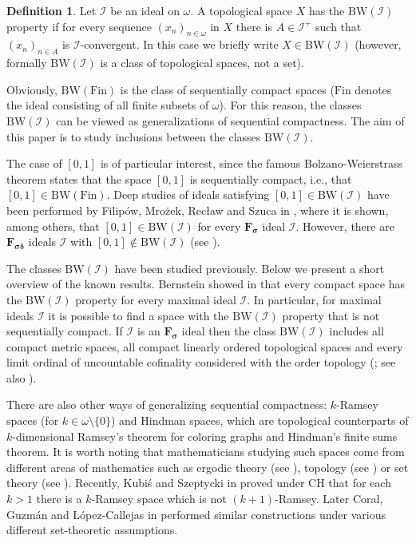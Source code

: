 \documentclass{amsart}
\theoremstyle{plain}
\theoremstyle{definition}
\newtheorem{definition}[theorem]{Definition}
\theoremstyle{remark}
\newcommand{\cI}{\mathcal{I}}
\newcommand{\I}{\cI}
\newcommand{\Fin}{\mathrm{Fin}}
\newcommand{\BW}{\mathrm{BW}}
\begin{document}
\begin{definition}
Let $\I$ be an ideal on $\omega$. A topological space $X$ has the $\BW(\I)$ property if for every sequence  $(x_n)_{n\in \omega}$ in $X$ there is $A\in\I^+$ such that $(x_n)_{n\in A}$ is $\I$-convergent. In this case we briefly write $X\in\BW(\I)$ (however, formally $\BW(\I)$ is a class of topological spaces, not a set). 
\end{definition}

Obviously, $\BW(\Fin)$ is the class of sequentially compact spaces ($\Fin$ denotes the ideal consisting of all finite subsets of $\omega$). For this reason, the classes $\BW(\I)$ can be viewed as generalizations of sequential compactness. The aim of this paper is to study inclusions between the classes $\BW(\I)$. 

The case of $[0,1]$ is of particular interest, since the famous Bolzano-Weierstrass theorem states that the space $[0,1]$ is sequentially compact, i.e., that $[0,1]\in\BW(\Fin)$. Deep studies of ideals satisfying $[0,1]\in\BW(\I)$ have been performed by Filip\'{o}w, Mro\.{z}ek, Rec\l{}aw and Szuca in \cite{MR2320288}, where it is shown, among others, that $[0,1]\in\BW(\I)$ for every $\mathbf{F_\sigma}$ ideal $\I$. However, there are $\mathbf{F_{\sigma\delta}}$ ideals $\I$ with $[0,1]\notin\BW(\I)$ (see \cite{MR1181163}).

The classes $\BW(\I)$ have been studied previously. Below we present a short overview of the known results. Bernstein showed in \cite[Theorem 3.3]{MR251697} that every compact space has the $\BW(\I)$ property for every maximal ideal $\I$. In particular, for maximal ideals $\I$ it is possible to find a space with the $\BW(\I)$ property that is not sequentially compact. If $\I$ is an $\mathbf{F_\sigma}$ ideal then the class $\BW(\I)$ includes all compact metric spaces, all compact linearly ordered topological spaces and every limit ordinal of uncountable cofinality considered with the order topology (\cite[Corollary 5.7]{MR2961261}; see also \cite[theorem 1.1]{FT}).

There are also other ways of generalizing sequential compactness: $k$-Ramsey spaces (for $k\in\omega\setminus\{0\}$) and Hindman spaces, which are topological counterparts of $k$-dimensional Ramsey's theorem for coloring graphs and Hindman's finite sums theorem. It is worth noting that mathematicians studying such spaces come from different areas of mathematics such as ergodic theory (see \cite{MR2757532,BergelsonZelada,MR603625,MR531271}), topology (see \cite{MR3461173,MR3461181,MR2904054}) or set theory (see \cite{KojmanShelah}). Recently, Kubi\'{s} and Szeptycki in \cite{MR4552506} proved under CH that for each $k>1$ there is a $k$-Ramsey space which is not $(k+1)$-Ramsey. Later Coral, Guzm\'{a}n and L\'{o}pez-Callejas in \cite{High-dimensional} performed similar constructions under various different set-theoretic assumptions.
\end{document}
